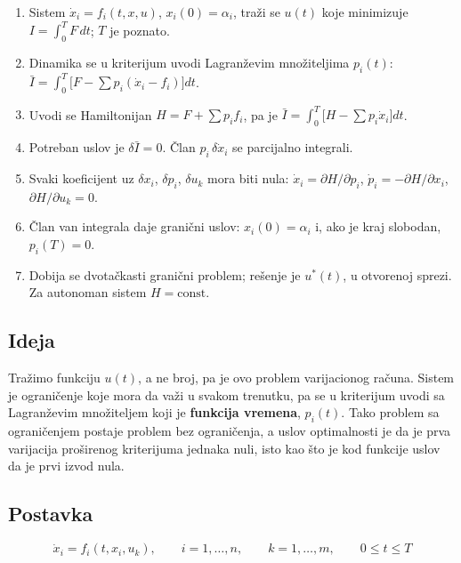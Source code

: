 \documentclass[11pt,a4paper,parskip=half,headsepline,numbers=noenddot]{scrartcl}
\begin{document}
\begin{kljucna}
\begin{enumerate}
\def\labelenumi{\arabic{enumi}.}
\item Sistem \(\dot x_i = f_i(t, x, u)\), \(x_i(0) = \alpha_i\), traži se \(u(t)\) koje minimizuje \(I = \int_0^T F\,dt\); \(T\) je poznato.
\item Dinamika se u kriterijum uvodi Lagranževim množiteljima \(p_i(t)\): \(\bar I = \int_0^T \big[F - \sum p_i(\dot x_i - f_i)\big]dt\).
\item Uvodi se Hamiltonijan \(H = F + \sum p_i f_i\), pa je \(\bar I = \int_0^T \big[H - \sum p_i \dot x_i\big]dt\).
\item Potreban uslov je \(\delta \bar I = 0\). Član \(p_i\,\delta\dot x_i\) se parcijalno integrali.
\item Svaki koeficijent uz \(\delta x_i\), \(\delta p_i\), \(\delta u_k\) mora biti nula: \(\dot x_i = \partial H/\partial p_i\), \(\dot p_i = -\partial H/\partial x_i\), \(\partial H/\partial u_k = 0\).
\item Član van integrala daje granični uslov: \(x_i(0) = \alpha_i\) i, ako je kraj slobodan, \(p_i(T) = 0\).
\item Dobija se dvotačkasti granični problem; rešenje je \(u^*(t)\), u otvorenoj sprezi. Za autonoman sistem \(H = \text{const}\).
\end{enumerate}
\end{kljucna}

\subsection{Ideja}

Tražimo funkciju \(u(t)\), a ne broj, pa je ovo problem varijacionog računa. Sistem je ograničenje koje mora da važi u svakom trenutku, pa se u kriterijum uvodi sa Lagranževim množiteljem koji je \textbf{funkcija vremena}, \(p_i(t)\). Tako problem sa ograničenjem postaje problem bez ograničenja, a uslov optimalnosti je da je prva varijacija proširenog kriterijuma jednaka nuli, isto kao što je kod funkcije uslov da je prvi izvod nula.

\subsection{Postavka}

\[\dot x_i = f_i(t, x_i, u_k), \qquad i = 1, \dots, n, \qquad k = 1, \dots, m, \qquad 0 \le t \le T\]
\end{document}
